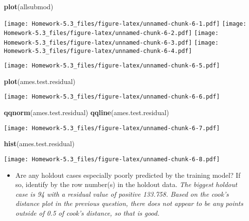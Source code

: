 \documentclass[
]{article}
\newenvironment{Shaded}{\begin{snugshade}}{\end{snugshade}}
\newcommand{\KeywordTok}[1]{\textcolor[rgb]{0.13,0.29,0.53}{\textbf{#1}}}
\newcommand{\NormalTok}[1]{#1}
\newcommand{\OperatorTok}[1]{\textcolor[rgb]{0.81,0.36,0.00}{\textbf{#1}}}
\providecommand{\tightlist}{%
  \setlength{\itemsep}{0pt}\setlength{\parskip}{0pt}}
\begin{document}
\begin{Shaded}
\begin{Highlighting}[]
\KeywordTok{plot}\NormalTok{(allsubmod)}
\end{Highlighting}
\end{Shaded}

\texttt{[image: Homework-5.3\_files/figure-latex/unnamed-chunk-6-1.pdf]}
\texttt{[image: Homework-5.3\_files/figure-latex/unnamed-chunk-6-2.pdf]}
\texttt{[image: Homework-5.3\_files/figure-latex/unnamed-chunk-6-3.pdf]}
\texttt{[image: Homework-5.3\_files/figure-latex/unnamed-chunk-6-4.pdf]}

\begin{Shaded}
\end{Shaded}

\texttt{[image: Homework-5.3\_files/figure-latex/unnamed-chunk-6-5.pdf]}

\begin{Shaded}
\begin{Highlighting}[]
\KeywordTok{plot}\NormalTok{(ames.test.residual)}
\end{Highlighting}
\end{Shaded}

\texttt{[image: Homework-5.3\_files/figure-latex/unnamed-chunk-6-6.pdf]}

\begin{Shaded}
\begin{Highlighting}[]
\KeywordTok{qqnorm}\NormalTok{(ames.test.residual)}
\KeywordTok{qqline}\NormalTok{(ames.test.residual)}
\end{Highlighting}
\end{Shaded}

\texttt{[image: Homework-5.3\_files/figure-latex/unnamed-chunk-6-7.pdf]}

\begin{Shaded}
\begin{Highlighting}[]
\KeywordTok{hist}\NormalTok{(ames.test.residual)}
\end{Highlighting}
\end{Shaded}

\texttt{[image: Homework-5.3\_files/figure-latex/unnamed-chunk-6-8.pdf]}

\begin{itemize}
\tightlist
\item
  Are any holdout cases especially poorly predicted by the training
  model? If so, identify by the row number(s) in the holdout data.
  \emph{The biggest holdout case is 94 with a residual value of positive
  133.758. Based on the cook's distance plot in the previous question,
  there does not appear to be any points outside of 0.5 of cook's
  distance, so that is good.}
\end{itemize}
\end{document}
